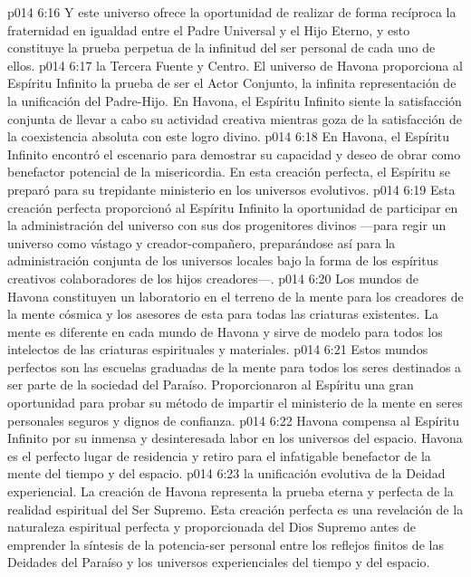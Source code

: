 \vs p014 6:16 Y este universo ofrece la oportunidad de realizar de forma recíproca la fraternidad en igualdad entre el Padre Universal y el Hijo Eterno, y esto constituye la prueba perpetua de la infinitud del ser personal de cada uno de ellos.
\vs p014 6:17  la Tercera Fuente y Centro. El universo de Havona proporciona al Espíritu Infinito la prueba de ser el Actor Conjunto, la infinita representación de la unificación del Padre\hyp{}Hijo. En Havona, el Espíritu Infinito siente la satisfacción conjunta de llevar a cabo su actividad creativa mientras goza de la satisfacción de la coexistencia absoluta con este logro divino.
\vs p014 6:18 En Havona, el Espíritu Infinito encontró el escenario para demostrar su capacidad y deseo de obrar como benefactor potencial de la misericordia. En esta creación perfecta, el Espíritu se preparó para su trepidante ministerio en los universos evolutivos.
\vs p014 6:19 Esta creación perfecta proporcionó al Espíritu Infinito la oportunidad de participar en la administración del universo con sus dos progenitores divinos ---para regir un universo como vástago y creador\hyp{}compañero, preparándose así para la administración conjunta de los universos locales bajo la forma de los espíritus creativos colaboradores de los hijos creadores---.
\vs p014 6:20 Los mundos de Havona constituyen un laboratorio en el terreno de la mente para los creadores de la mente cósmica y los asesores de esta para todas las criaturas existentes. La mente es diferente en cada mundo de Havona y sirve de modelo para todos los intelectos de las criaturas espirituales y materiales.
\vs p014 6:21 Estos mundos perfectos son las escuelas graduadas de la mente para todos los seres destinados a ser parte de la sociedad del Paraíso. Proporcionaron al Espíritu una gran oportunidad para probar su método de impartir el ministerio de la mente en seres personales seguros y dignos de confianza.
\vs p014 6:22 Havona compensa al Espíritu Infinito por su inmensa y desinteresada labor en los universos del espacio. Havona es el perfecto lugar de residencia y retiro para el infatigable benefactor de la mente del tiempo y del espacio.
\vs p014 6:23  la unificación evolutiva de la Deidad experiencial. La creación de Havona representa la prueba eterna y perfecta de la realidad espiritual del Ser Supremo. Esta creación perfecta es una revelación de la naturaleza espiritual perfecta y proporcionada del Dios Supremo antes de emprender la síntesis de la potencia\hyp{}ser personal entre los reflejos finitos de las Deidades del Paraíso y los universos experienciales del tiempo y del espacio.
